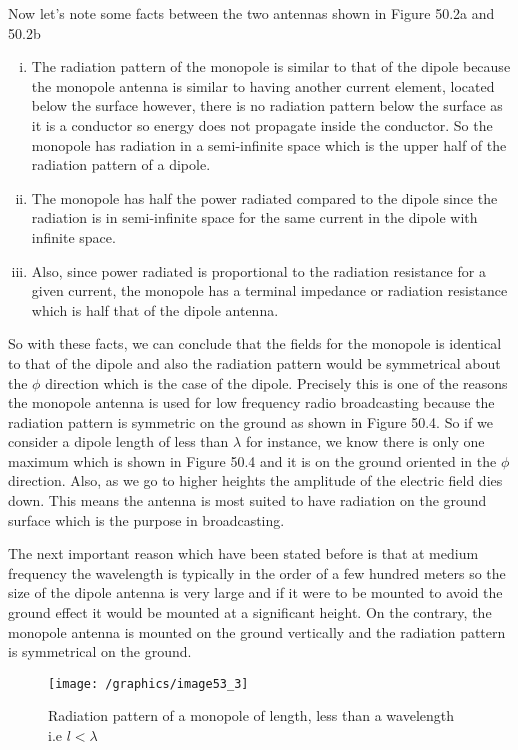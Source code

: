 Now let's note some facts between the two antennas shown in Figure 50.2a and 50.2b
\begin{enumerate}[(i)]
\item The radiation pattern of the monopole is similar to that of the dipole because the monopole antenna is similar to having another current element, located below the surface however, there is no radiation pattern below the surface as it is a conductor so energy does not propagate inside the conductor. So the monopole has radiation in a semi-infinite space which is the upper half of the radiation pattern of a dipole.
\item The monopole has half the power radiated compared to the dipole since the radiation is in semi-infinite space for the same current in the dipole with infinite space.
\item Also, since power radiated is proportional to the radiation resistance for a given current, the monopole has a terminal impedance or radiation resistance which is half that of the dipole antenna.
\end{enumerate}
So with these facts, we can conclude that the fields for the monopole is identical to that of the dipole and also the radiation pattern would be symmetrical about the $\phi$ direction which is the case of the dipole. Precisely this is one of the reasons the monopole antenna is used for low frequency radio broadcasting because the radiation pattern is symmetric on the ground as shown in Figure 50.4. So if we consider a dipole length of less than $\lambda$ for instance, we know there is only one maximum which is shown in Figure 50.4 and it is on the ground oriented in the $\phi$ direction. Also, as we go to higher heights the amplitude of the electric field dies down. This means the antenna is most suited to have radiation on the ground surface which is the purpose in broadcasting.

The next important reason which have been stated before is that at medium frequency the wavelength is typically in the order of a few hundred meters so the size of the dipole antenna is very large and if it were to be mounted to avoid the ground effect it would be mounted at a significant height. On the contrary, the monopole antenna is mounted on the ground vertically and the radiation pattern is symmetrical on the ground.
\begin{figure}[h]
\centering
\texttt{[image: /graphics/image53\_3]}
\caption{Radiation pattern of a monopole of length, less than a wavelength i.e $l < \lambda$}
\label{fig:fig3}
\end{figure}


